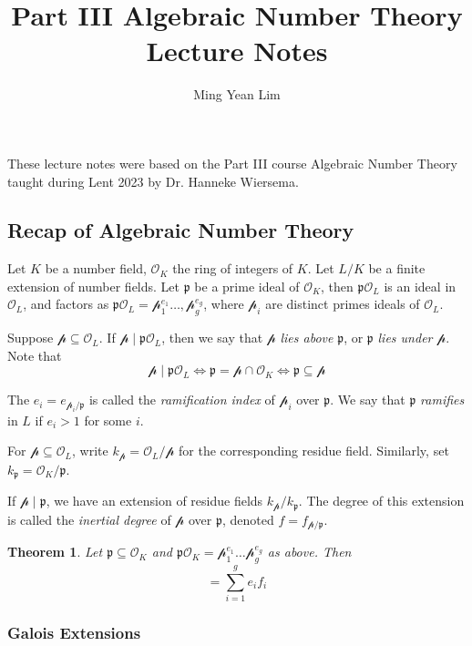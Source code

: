 \documentclass[11pt]{article}
\title{Part III Algebraic Number Theory Lecture Notes}
\author{Ming Yean Lim}
\theoremstyle{definition}
\theoremstyle{plain}
\newtheorem{theorem}[definition]{Theorem}
\theoremstyle{remark}
\newcommand{\cO}{\mathcal{O}}
\newcommand{\cp}{\mathcal{p}}
\newcommand{\fp}{\mathfrak{p}}
\begin{document}
\maketitle

\noindent These lecture notes were based on the Part III course Algebraic Number Theory taught during Lent 2023 by Dr. Hanneke Wiersema.




\subsection{Recap of Algebraic Number Theory}

Let $K$ be a number field, $\cO_K$ the ring of integers of $K$. Let $L/K$ be a finite extension of number fields. Let $\fp$ be a prime ideal of $\cO_K$, then $\fp \cO_L$ is an ideal in $\cO_L$, and factors as $\fp \cO_L = \cp_1^{e_1} \ldots, \cp_g^{e_g}$, where $\cp_i$ are distinct primes ideals of $\cO_L$.

Suppose $\cp \subseteq \cO_L$. If $\cp \mid \fp \cO_L$, then we say that $\cp$ \emph{lies above} $\fp$, or $\fp$ \emph{lies under} $\cp$. Note that
\begin{equation*}
    \cp \mid \fp \cO_L \iff \fp = \cp \cap \cO_K \iff \fp \subseteq \cp
\end{equation*}

The $e_i = e_{\cp_i / \fp}$ is called the \emph{ramification index} of $\cp_i$ over $\fp$. We say that $\fp$ \emph{ramifies} in $L$ if $e_i > 1$ for some $i$.

For $\cp \subseteq \cO_L$, write $k_\cp = \cO_L / \cp$ for the corresponding residue field. Similarly, set $k_\fp = \cO_K / \fp$.

If $\cp \mid \fp$, we have an extension of residue fields $k_\cp / k_\fp$. The degree of this extension is called the \emph{inertial degree} of $\cp$ over $\fp$, denoted $f = f_{\cp / \fp}$.

\begin{theorem}\label{thm:1_1}
    Let $\fp \subseteq \cO_K$ and $\fp \cO_K = \cp_1^{e_1} \ldots \cp_g^{e_g}$ as above. Then
    \begin{equation*}
        [L : K] = \sum_{i=1}^g e_i f_i
    \end{equation*}
\end{theorem}

\subsubsection*{Galois Extensions}
\end{document}
